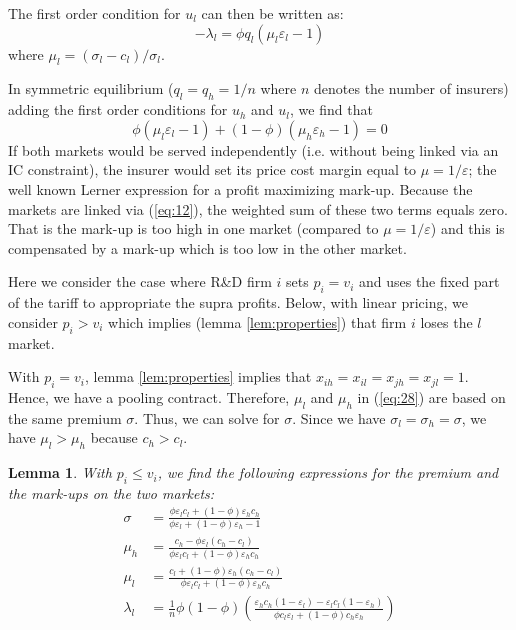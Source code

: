 \documentclass[12pt,english,a4paper]{article}
\newtheorem{lemma}{Lemma}
\begin{document}
The first order condition for \(u_l\) can then be written as:
\begin{equation}
\label{eq:36}
-\lambda_l = \phi q_l (\mu_l \varepsilon_l -1)
\end{equation}
where \(\mu_l=(\sigma_l-c_l)/\sigma_l\).

In symmetric equilibrium (\(q_l=q_h=1/n\) where \(n\) denotes the number of insurers) adding the first order conditions for \(u_h\) and \(u_l\), we find that
\begin{equation}
\label{eq:28}
\phi (\mu_l \varepsilon_l-1) + (1-\phi) (\mu_h \varepsilon_h -1) = 0
\end{equation}
If both markets would be served independently (i.e. without being linked via an IC constraint), the insurer would set its price cost margin equal to \(\mu = 1/\varepsilon\); the well known Lerner expression for a profit maximizing mark-up. Because the markets are linked via (\ref{eq:12}), the weighted sum of these two terms equals zero. That is the mark-up is too high in one market (compared to \(\mu=1/\varepsilon\)) and this is compensated by a mark-up which is too low in the other market.

Here we consider the case where R\&D firm \(i\) sets \(p_i=v_i\) and uses the fixed part of the tariff to appropriate the supra profits. Below, with linear pricing, we consider \(p_i>v_i\) which implies (lemma \ref{lem:properties}) that firm \(i\) loses the \(l\) market.

With \(p_i=v_i\), lemma \ref{lem:properties} implies that \(x_{ih}=x_{il}=x_{jh}=x_{jl}=1\). Hence, we have a pooling contract. Therefore, \(\mu_l\) and \(\mu_h\) in (\ref{eq:28}) are based on the same premium \(\sigma\). Thus, we can solve for \(\sigma\). Since we have \(\sigma_l=\sigma_h=\sigma\), we have \(\mu_l > \mu_h\) because \(c_h>c_l\).

\begin{lemma} \label{lem:EqSigma}
With $p_i \leq v_i$, we find the following expressions for the premium and the mark-ups on the two markets:
\begin{align}
\label{eq:29}
\sigma &= \frac{\phi \varepsilon_l c_l +(1-\phi) \varepsilon_h c_h }{\phi \varepsilon_l +(1-\phi) \varepsilon_h-1} \\
\label{eq:29a}
\mu_h &=  \frac{c_h -\phi \varepsilon_l (c_{h}-c_l)}{\phi \varepsilon_lc_l +(1-\phi) \varepsilon_h c_h} \\
\label{eq:29b}
\mu_l &=  \frac{c_l +(1-\phi) \varepsilon_h (c_{h}-c_l)}{\phi \varepsilon_lc_l +(1-\phi) \varepsilon_h c_h} \\
\label{eq:43}
\lambda_l &= \frac{1}{n}\phi(1-\phi) \left( \frac{\varepsilon_h c_h (1-\varepsilon_l) - \varepsilon_l c_l (1-\varepsilon_h)}{\phi c_l\varepsilon_l + (1-\phi) c_h \varepsilon_h} \right)
\end{align}
\end{lemma}
\end{document}
